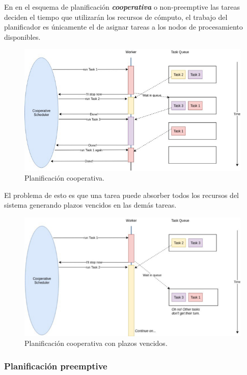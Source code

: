 En en el esquema de planificación \textit{\textbf{cooperativa}} o non-preemptive las tareas deciden el tiempo que utilizarán los recursos de cómputo, el trabajo del planificador es únicamente el de asignar tareas a los nodos de procesamiento disponibles.      

  \begin{figure}[ht]
      \centering
        \includegraphics[scale=1.5]{img/schedCoo}
        \caption{Planificación cooperativa.\cite{medium}}
        \label{fig:schedcoo}
    \end{figure}
    
El problema de esto es que una tarea puede absorber todos los recursos del sistema generando plazos vencidos en las demás tareas.

  \begin{figure}[ht]
      \centering
        \includegraphics[scale=1.5]{img/schedCooDead}
        \caption{Planificación cooperativa con plazos vencidos.\cite{medium}}
        \label{fig:schedcoodead}
    \end{figure}
    
\subsubsection{Planificación preemptive}

